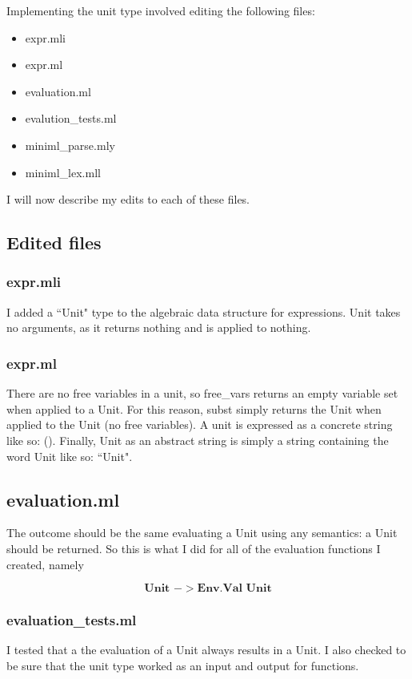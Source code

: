 \documentclass{article}
\begin{document}
Implementing the unit type involved editing the following files:

\begin{itemize}
    \item expr.mli
    \item expr.ml
    \item evaluation.ml
    \item evalution\_tests.ml
    \item miniml\_parse.mly
    \item miniml\_lex.mll

\end{itemize}

I will now describe my edits to each of these files. 

\subsection{Edited files}

\subsubsection{expr.mli}
I added a ``Unit" type to the algebraic data structure for expressions. Unit takes no arguments, as it returns nothing and is applied to nothing.

\subsubsection{expr.ml}
There are no free variables in a unit, so free\_vars returns an empty variable set when applied to a Unit. For this reason, subst simply returns the Unit when applied to the Unit (no free variables). A unit is expressed as a concrete string like so: (). Finally, Unit as an abstract string is simply a string containing the word Unit like so: ``Unit".

\subsection{evaluation.ml}
The outcome should be the same evaluating a Unit using any semantics: a Unit should be returned. So this is what I did for all of the evaluation functions I created, namely

$$\textbf{Unit } -> \textbf{Env.Val Unit}$$

\subsubsection{evaluation\_tests.ml}
I tested that a the evaluation of a Unit always results in a Unit. I also checked to be sure that the unit type worked as an input and output for functions.
\end{document}
